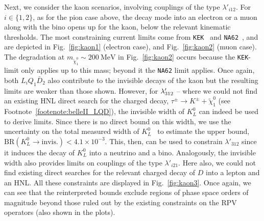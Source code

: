 Next, we consider the kaon scenarios, involving couplings of the type $\lambda'_{i12}$. For 
$i\in\{1,2\}$, as for the pion case above, the decay mode into an electron or a muon along 
with the bino opens up for the kaon, below the relevant kinematic thresholds. The most 
constraining current limits come from \texttt{KEK}~\cite{Asano:1981he, Hayano:1982wu} and 
\texttt{NA62}~\cite{NA62:2020mcv, NA62:2021bji}, and are depicted in Fig.~\ref{fig:kaon1} 
(electron case), and Fig.~\ref{fig:kaon2} (muon case).
The degradation at $m_{\tilde{\chi}^0_1}\sim \SI{200}{\MeV}$ in Fig.~\ref{fig:kaon2} occurs 
because the \texttt{KEK}-limit only applies up to this mass; beyond it the \texttt{NA62} 
limit applies. Once again, both $L_iQ_1\bar D_2$ also contribute to the invisible decays of the kaon but the 
resulting limits are weaker than those shown. However, for $\lambda'_{312}$ 
-- where we could not find an existing HNL direct search for the charged decay, $\tau^\pm \to 
K^\pm + \tilde{\chi}^0_1$ (see Footnote~\ref{footenote:belleII_LQD}), the invisible width of $K^0_L$ can indeed be used to derive limits. 
Since there is no direct bound on this width, we use the uncertainty on the total measured 
width of $K^0_L$~\cite{ParticleDataGroup:2022pth} to estimate the upper bound, $\text{BR}(K^0_L \to 
\text{invis.}) < 4.1 \times 10^{-3}$. This, then, can be used to constrain $\lambda'_{312}$ 
since it induces the decay of $K^0_L$ into a neutrino and a bino. Analogously, the invisible 
width also provides limits on couplings of the type $\lambda'_{i21}$. Here also, we could 
not find existing direct searches for the relevant charged decay of $D$ into a lepton and 
an HNL. All these constraints are displayed in Fig.~\ref{fig:kaon3}. Once again, we can see 
that the reinterpreted bounds exclude regions of phase space orders of magnitude beyond 
those ruled out by the existing constraints on the RPV operators (also shown in the plots).

